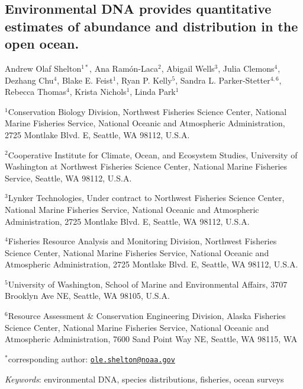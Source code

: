 \documentclass[
]{article}
\author{}
\date{\vspace{-2.5em}}
\begin{document}
\hypertarget{environmental-dna-provides-quantitative-estimates-of-abundance-and-distribution-in-the-open-ocean.}{%
\subsection{Environmental DNA provides quantitative estimates of 
abundance and distribution in the open ocean.}\label{environmental-dna-provides-quantitative-estimates-of-abundance-and-distribution-in-the-open-ocean.}}

Andrew Olaf Shelton\(^{1*}\), Ana Ram\'on-Laca\(^2\), Abigail
Wells\(^3\), Julia Clemons\(^{4}\), Dezhang Chu\(^{4}\), Blake E.
Feist\(^1\), Ryan P. Kelly\(^{5}\), Sandra L. Parker-Stetter\(^{4,6}\),
Rebecca Thomas\(^{4}\), Krista Nichols\(^1\), Linda Park\(^1\)

\(^1\)Conservation Biology Division, Northwest Fisheries Science Center,
National Marine Fisheries Service, National Oceanic and Atmospheric
Administration, 2725 Montlake Blvd. E, Seattle, WA 98112, U.S.A.

\(^2\)Cooperative Institute for Climate, Ocean, and Ecosystem Studies, University of Washington at Northwest Fisheries Science
Center, National Marine Fisheries Service, Seattle, WA 98112, U.S.A.

\(^3\)Lynker Technologies, Under contract to Northwest Fisheries Science
Center, National Marine Fisheries Service, National Oceanic and
Atmospheric Administration, 2725 Montlake Blvd. E, Seattle, WA 98112,
U.S.A.

\(^{4}\)Fisheries Resource Analysis and Monitoring Division, Northwest
Fisheries Science Center, National Marine Fisheries Service, National
Oceanic and Atmospheric Administration, 2725 Montlake Blvd. E, Seattle,
WA 98112, U.S.A.

\(^{5}\)University of Washington, School of Marine and Environmental
Affairs, 3707 Brooklyn Ave NE, Seattle, WA 98105, U.S.A.

\(^{6}\)Resource Assessment \& Conservation Engineering Division, Alaska
Fisheries Science Center, National Marine Fisheries Service, National
Oceanic and Atmospheric Administration, 7600 Sand Point Way NE, Seattle,
WA 98115, WA

\(^{*}\)corresponding author:
\href{mailto:ole.shelton@noaa.gov}{\nolinkurl{ole.shelton@noaa.gov}}

\emph{Keywords}: environmental DNA, species distributions, fisheries, ocean surveys

\pagebreak
\end{document}
